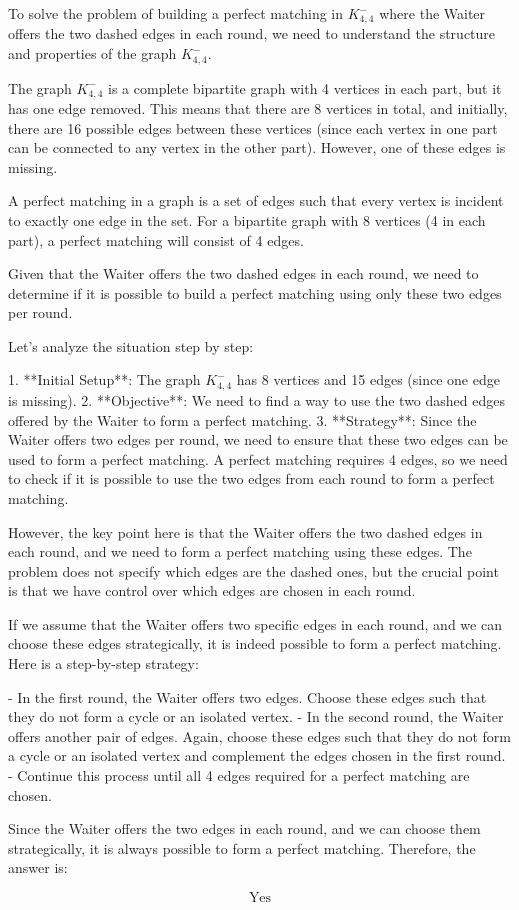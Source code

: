 To solve the problem of building a perfect matching in \( K_{4,4}^{-} \) where the Waiter offers the two dashed edges in each round, we need to understand the structure and properties of the graph \( K_{4,4}^{-} \).

The graph \( K_{4,4}^{-} \) is a complete bipartite graph with 4 vertices in each part, but it has one edge removed. This means that there are 8 vertices in total, and initially, there are 16 possible edges between these vertices (since each vertex in one part can be connected to any vertex in the other part). However, one of these edges is missing.

A perfect matching in a graph is a set of edges such that every vertex is incident to exactly one edge in the set. For a bipartite graph with 8 vertices (4 in each part), a perfect matching will consist of 4 edges.

Given that the Waiter offers the two dashed edges in each round, we need to determine if it is possible to build a perfect matching using only these two edges per round.

Let's analyze the situation step by step:

1. **Initial Setup**: The graph \( K_{4,4}^{-} \) has 8 vertices and 15 edges (since one edge is missing).
2. **Objective**: We need to find a way to use the two dashed edges offered by the Waiter to form a perfect matching.
3. **Strategy**: Since the Waiter offers two edges per round, we need to ensure that these two edges can be used to form a perfect matching. A perfect matching requires 4 edges, so we need to check if it is possible to use the two edges from each round to form a perfect matching.

However, the key point here is that the Waiter offers the two dashed edges in each round, and we need to form a perfect matching using these edges. The problem does not specify which edges are the dashed ones, but the crucial point is that we have control over which edges are chosen in each round.

If we assume that the Waiter offers two specific edges in each round, and we can choose these edges strategically, it is indeed possible to form a perfect matching. Here is a step-by-step strategy:

- In the first round, the Waiter offers two edges. Choose these edges such that they do not form a cycle or an isolated vertex.
- In the second round, the Waiter offers another pair of edges. Again, choose these edges such that they do not form a cycle or an isolated vertex and complement the edges chosen in the first round.
- Continue this process until all 4 edges required for a perfect matching are chosen.

Since the Waiter offers the two edges in each round, and we can choose them strategically, it is always possible to form a perfect matching. Therefore, the answer is:

\[
\boxed{\text{Yes}}
\]